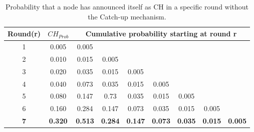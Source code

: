 \begin{table}[bt]
\centering
\caption{Probability that a node has announced itself as CH in a specific round without the Catch-up mechanism.}
\label{tab:prob-no-catchup}
\begin{tabular}{|c|c|c|cccccc|}
\hline
\textbf{Round(r)} & \textbf{$CH_{Prob}$} & \multicolumn{7}{c|}{\textbf{Cumulative probability starting at round r}}                                                                                       \\ \hline
1                 & 0.005                & 0.005 &                            &                            &                            &                            &                            &       \\ \cline{1-4}
2                 & 0.010                & 0.015 & \multicolumn{1}{c|}{0.005} &                            &                            &                            &                            &       \\ \cline{1-5}
3                 & 0.020                & 0.035 & \multicolumn{1}{c|}{0.015} & \multicolumn{1}{c|}{0.005} &                            &                            &                            &       \\ \cline{1-6}
4                 & 0.040                & 0.073 & \multicolumn{1}{c|}{0.035} & \multicolumn{1}{c|}{0.015} & \multicolumn{1}{c|}{0.005} &                            &                            &       \\ \cline{1-7}
5                 & 0.080                & 0.147 & \multicolumn{1}{c|}{0.73}  & \multicolumn{1}{c|}{0.035} & \multicolumn{1}{c|}{0.015} & \multicolumn{1}{c|}{0.005} &                            &       \\ \cline{1-8}
6                 & 0.160                & 0.284 & \multicolumn{1}{c|}{0.147} & \multicolumn{1}{c|}{0.073} & \multicolumn{1}{c|}{0.035} & \multicolumn{1}{c|}{0.015} & \multicolumn{1}{c|}{0.005} &       \\ \hline
\textbf{7}                 & \textbf{0.320}                & \textbf{0.513} & \multicolumn{1}{c|}{\textbf{0.284}} & \multicolumn{1}{c|}{\textbf{0.147}} & \multicolumn{1}{c|}{\textbf{0.073}} & \multicolumn{1}{c|}{\textbf{0.035}} & \multicolumn{1}{c|}{\textbf{0.015}} & \textbf{0.005} \\ \hline
\end{tabular}
\end{table}

